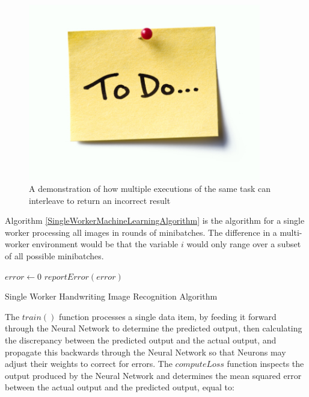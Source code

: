 \documentclass[12pt]{article}
\begin{document}
\begin{figure}[H]
  \centering
  \includegraphics[width=4in]{todo}
  \caption[]{A demonstration of how multiple executions of the same task can interleave to return an incorrect result}
  \label{ParameterServerArchitecture}
\end{figure}

Algorithm \ref{SingleWorkerMachineLearningAlgorithm} is the algorithm for a single worker processing all images in rounds of minibatches. The difference in a multi-worker environment would be that the variable $i$ would only range over a subset of all possible minibatches.

\IncMargin{1em}
\begin{algorithm}[H]
 \BlankLine

$error \longleftarrow 0$\;
  $reportError(error)$\;
 \caption{Single Worker Handwriting Image Recognition Algorithm}
 \label{SingleWorkerMachineLearningAlgorithm}
\end{algorithm}
\DecMargin{1em}
\medskip

The $train()$ function processes a single data item, by feeding it forward through the Neural Network to determine the predicted output, then calculating the discrepancy between the predicted output and the actual output, and propagate this backwards through the Neural Network so that Neurons may adjust their weights to correct for errors. The $computeLoss$ function inspects the output produced by the Neural Network and determines the mean squared error between the actual output and the predicted output, equal to:
\end{document}
